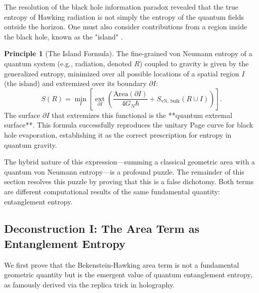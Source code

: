 \documentclass[11pt, letterpaper]{report}
\theoremstyle{plain} %
\theoremstyle{definition} %
\newtheorem{principle}{Principle}[chapter]
\theoremstyle{remark} %
\begin{document}
The resolution of the black hole information paradox revealed that the true entropy of Hawking radiation is not simply the entropy of the quantum fields outside the horizon. One must also consider contributions from a region inside the black hole, known as the "island" \cite{Penington2019EntanglementWedge,Almheiri2019Islands}.

\begin{principle}[The Island Formula]
\label{principle:island_formula}
The fine-grained von Neumann entropy of a quantum system (e.g., radiation, denoted $R$) coupled to gravity is given by the generalized entropy, minimized over all possible locations of a spatial region $I$ (the island) and extremized over its boundary $\partial I$:
\begin{equation}
    S(R) = \min_{I} \left[ \operatorname*{ext}_{\partial I} \left( \frac{\text{Area}(\partial I)}{4G_N\hbar} + S_{\text{vN, bulk}}(R \cup I) \right) \right].
    \label{eq:island_formula}
\end{equation}
The surface $\partial I$ that extremizes this functional is the **quantum extremal surface**. This formula successfully reproduces the unitary Page curve for black hole evaporation, establishing it as the correct prescription for entropy in quantum gravity.
\end{principle}

The hybrid nature of this expression—summing a classical geometric area with a quantum von Neumann entropy—is a profound puzzle. The remainder of this section resolves this puzzle by proving that this is a false dichotomy. Both terms are different computational results of the same fundamental quantity: entanglement entropy.

\subsection{Deconstruction I: The Area Term as Entanglement Entropy}
\label{subsec:proof_geometric_from_entanglement}

We first prove that the Bekenstein-Hawking area term is not a fundamental geometric quantity but is the emergent value of quantum entanglement entropy, as famously derived via the replica trick in holography.
\end{document}
